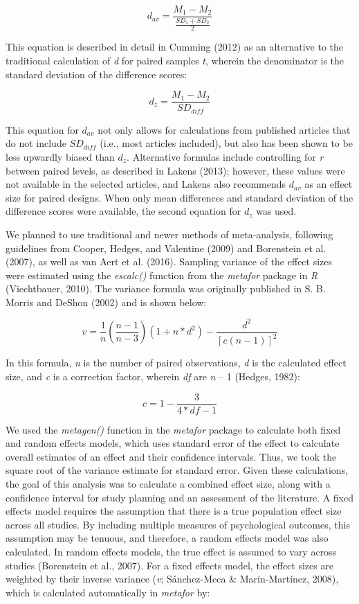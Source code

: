 \documentclass[english,man]{apa6}
\theoremstyle{definition}
\theoremstyle{definition}
\theoremstyle{definition}
\theoremstyle{remark}
\begin{document}
\[
{d_{av}} = \frac { M_1 - M_2 } { \frac { SD_1 + SD_2 } { 2 }}
\]

This equation is described in detail in Cumming (2012) as an alternative
to the traditional calculation of \emph{d} for paired samples \emph{t},
wherein the denominator is the standard deviation of the difference
scores:

\[
{d_{z}} = \frac { M_1 - M_2 } { SD_{diff} }
\]

This equation for \(d_{av}\) not only allows for calculations from
published articles that do not include \(SD_{diff}\) (i.e., most
articles included), but also has been shown to be less upwardly biased
than \(d_{z}\). Alternative formulas include controlling for \emph{r}
between paired levels, as described in Lakens (2013); however, these
values were not available in the selected articles, and Lakens also
recommends \(d_{av}\) as an effect size for paired designs. When only
mean differences and standard deviation of the difference scores were
available, the second equation for \(d_z\) was used.

We planned to use traditional and newer methods of meta-analysis,
following guidelines from Cooper, Hedges, and Valentine (2009) and
Borenstein et al. (2007), as well as van Aert et al. (2016). Sampling
variance of the effect sizes were estimated using the \emph{escalc()}
function from the \emph{metafor} package in \emph{R} (Viechtbauer,
2010). The variance formula was originally published in S. B. Morris and
DeShon (2002) and is shown below:

\[
v = \frac { 1 } { n } (\frac { n - 1 } { n - 3 } )(1 + n*d^2) - \frac { d^2 } { [c(n-1)]^2}
\]

In this formula, \emph{n} is the number of paired observations, \emph{d}
is the calculated effect size, and \emph{c} is a correction factor,
wherein \emph{df} are \emph{n} -- 1 (Hedges, 1982):

\[
c = 1 - \frac { 3 } { 4*df - 1 }
\]

We used the \emph{metagen()} function in the \emph{metafor} package to
calculate both fixed and random effects models, which uses standard
error of the effect to calculate overall estimates of an effect and
their confidence intervals. Thus, we took the square root of the
variance estimate for standard error. Given these calculations, the goal
of this analysis was to calculate a combined effect size, along with a
confidence interval for study planning and an assessment of the
literature. A fixed effects model requires the assumption that there is
a true population effect size across all studies. By including multiple
measures of psychological outcomes, this assumption may be tenuous, and
therefore, a random effects model was also calculated. In random effects
models, the true effect is assumed to vary across studies (Borenstein et
al., 2007). For a fixed effects model, the effect sizes are weighted by
their inverse variance (\emph{v}; Sánchez-Meca \& Marín-Martínez, 2008),
which is calculated automatically in \emph{metafor} by:
\end{document}
